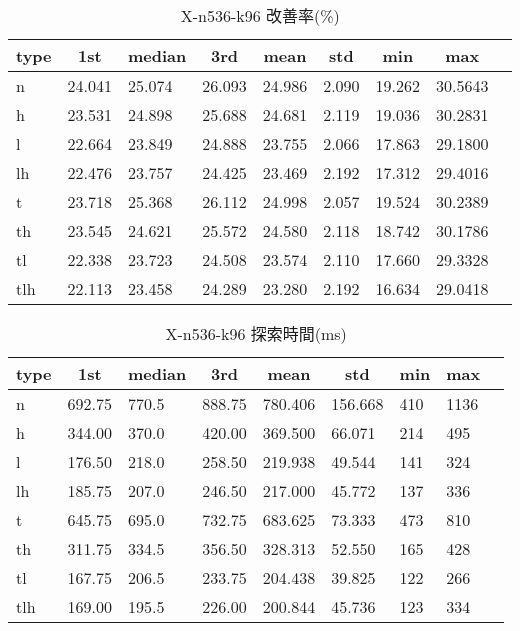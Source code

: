 \begin{table}[htbp]
    \caption{X-n536-k96 改善率(\%)}
    \begin{tabular}{|l|l|l|l|l|l|l|l|l|}\hline
    \multicolumn{1}{|c|}{\textbf{type}}
    &\multicolumn{1}{|c|}{\textbf{1st}}
    &\multicolumn{1}{c|}{\textbf{median}}
    &\multicolumn{1}{c|}{\textbf{3rd}}
    &\multicolumn{1}{c|}{\textbf{mean}}
    &\multicolumn{1}{c|}{\textbf{std}}
    &\multicolumn{1}{c|}{\textbf{min}}
    &\multicolumn{1}{c|}{\textbf{max}}\\\hline
	n & 24.041 & 25.074 & 26.093 & 24.986 & 2.090 & 19.262 & 30.5643\\\hline
	h & 23.531 & 24.898 & 25.688 & 24.681 & 2.119 & 19.036 & 30.2831\\\hline
	l & 22.664 & 23.849 & 24.888 & 23.755 & 2.066 & 17.863 & 29.1800\\\hline
	lh & 22.476 & 23.757 & 24.425 & 23.469 & 2.192 & 17.312 & 29.4016\\\hline
	t & 23.718 & 25.368 & 26.112 & 24.998 & 2.057 & 19.524 & 30.2389\\\hline
	th & 23.545 & 24.621 & 25.572 & 24.580 & 2.118 & 18.742 & 30.1786\\\hline
	tl & 22.338 & 23.723 & 24.508 & 23.574 & 2.110 & 17.660 & 29.3328\\\hline
	tlh & 22.113 & 23.458 & 24.289 & 23.280 & 2.192 & 16.634 & 29.0418\\\hline
	\end{tabular}
\end{table}
\begin{table}[htbp]
    \caption{X-n536-k96 探索時間(ms)}
    \begin{tabular}{|l|l|l|l|l|l|l|l|l|}\hline
    \multicolumn{1}{|c|}{\textbf{type}}
    &\multicolumn{1}{|c|}{\textbf{1st}}
    &\multicolumn{1}{c|}{\textbf{median}}
    &\multicolumn{1}{c|}{\textbf{3rd}}
    &\multicolumn{1}{c|}{\textbf{mean}}
    &\multicolumn{1}{c|}{\textbf{std}}
    &\multicolumn{1}{c|}{\textbf{min}}
    &\multicolumn{1}{c|}{\textbf{max}}\\\hline
	n & 692.75 & 770.5 & 888.75 & 780.406 & 156.668 & 410 & 1136\\\hline
	h & 344.00 & 370.0 & 420.00 & 369.500 & 66.071 & 214 & 495\\\hline
	l & 176.50 & 218.0 & 258.50 & 219.938 & 49.544 & 141 & 324\\\hline
	lh & 185.75 & 207.0 & 246.50 & 217.000 & 45.772 & 137 & 336\\\hline
	t & 645.75 & 695.0 & 732.75 & 683.625 & 73.333 & 473 & 810\\\hline
	th & 311.75 & 334.5 & 356.50 & 328.313 & 52.550 & 165 & 428\\\hline
	tl & 167.75 & 206.5 & 233.75 & 204.438 & 39.825 & 122 & 266\\\hline
	tlh & 169.00 & 195.5 & 226.00 & 200.844 & 45.736 & 123 & 334\\\hline
	\end{tabular}
\end{table}
